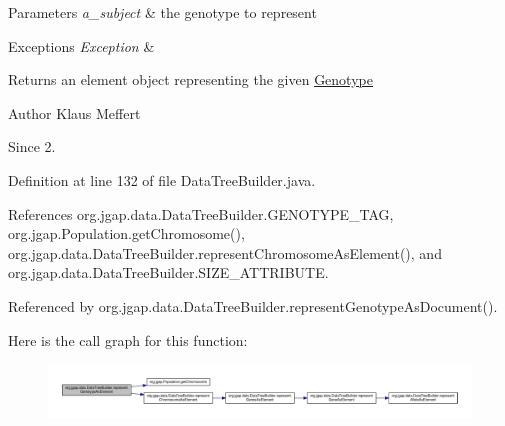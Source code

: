 \begin{DoxyParams}{Parameters}
{\em a\-\_\-subject} & the genotype to represent \\
\hline
\end{DoxyParams}

\begin{DoxyExceptions}{Exceptions}
{\em Exception} & \\
\hline
\end{DoxyExceptions}
\begin{DoxyReturn}{Returns}
an element object representing the given \hyperlink{classorg_1_1jgap_1_1_genotype}{Genotype}
\end{DoxyReturn}
\begin{DoxyAuthor}{Author}
Klaus Meffert 
\end{DoxyAuthor}
\begin{DoxySince}{Since}
2. 
\end{DoxySince}


Definition at line 132 of file Data\-Tree\-Builder.\-java.



References org.\-jgap.\-data.\-Data\-Tree\-Builder.\-G\-E\-N\-O\-T\-Y\-P\-E\-\_\-\-T\-A\-G, org.\-jgap.\-Population.\-get\-Chromosome(), org.\-jgap.\-data.\-Data\-Tree\-Builder.\-represent\-Chromosome\-As\-Element(), and org.\-jgap.\-data.\-Data\-Tree\-Builder.\-S\-I\-Z\-E\-\_\-\-A\-T\-T\-R\-I\-B\-U\-T\-E.



Referenced by org.\-jgap.\-data.\-Data\-Tree\-Builder.\-represent\-Genotype\-As\-Document().



Here is the call graph for this function\-:
\nopagebreak
\begin{figure}[H]
\begin{center}
\leavevmode
\includegraphics[width=350pt]{classorg_1_1jgap_1_1data_1_1_data_tree_builder_a1ffcea007c559a61a872ee14c6150888_cgraph}
\end{center}
\end{figure}




